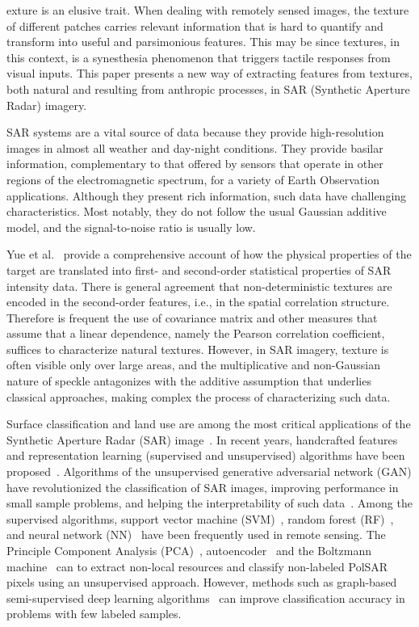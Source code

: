 \documentclass[journal]{IEEEtran}
\begin{document}
	exture is an elusive trait.
	When dealing with remotely sensed images, the texture of different patches carries relevant information that is hard to quantify and transform into useful and parsimonious features.
	This may be since textures, in this context, is a synesthesia phenomenon that triggers tactile responses from visual inputs.
	This paper presents a new way of extracting features from textures, both natural and resulting from anthropic processes, in SAR (Synthetic Aperture Radar) imagery.
	
	SAR systems are a vital source of data because they provide high-resolution images in almost all weather and day-night conditions.
	They provide basilar information, complementary to that offered by sensors that operate in other regions of the electromagnetic spectrum, for a variety of Earth Observation applications.	
	Although they present rich information, such data have challenging characteristics.
	Most notably, they do not follow the usual Gaussian additive model, and the signal-to-noise ratio is usually low.
	
	Yue et al.~\cite{Yue2020Gaussian} provide a comprehensive account of how the physical properties of the target are translated into first- and second-order statistical properties of SAR intensity data.
	There is general agreement that non-deterministic textures are encoded in the second-order features, i.e., in the spatial correlation structure.
	Therefore is frequent the use of covariance matrix and other measures that assume that a linear dependence, namely the Pearson correlation coefficient, suffices to characterize natural textures.
	However, in SAR imagery, texture is often visible only over large areas, and the multiplicative and non-Gaussian nature of speckle antagonizes with the additive assumption that underlies classical approaches, making complex the process of characterizing such data.
	
	Surface classification and land use are among the most critical applications of the Synthetic Aperture Radar (SAR) image~\cite{Pottier2004Unsupervised}.
	In recent years, handcrafted features and representation learning (supervised and unsupervised) algorithms have been proposed~\cite{han2020unsupervised, huang2020classification, xie2020polsar}.
	Algorithms of the unsupervised generative adversarial network (GAN) have revolutionized the classification of SAR images, improving performance in small sample problems, and helping the interpretability of such data~\cite{liu2019task}.
	Among the supervised algorithms, support vector machine (SVM)~\cite{sukawattanavijit2017ga}, random forest (RF)~\cite{mcnairn2014early}, and neural network (NN)~\cite{lin2017deep} have been frequently used in remote sensing.
	The Principle Component Analysis (PCA)~\cite{ressel2015neural}, autoencoder~\cite{wang2019classification} and the Boltzmann machine~\cite{qin2017object} can to extract non-local resources and classify non-labeled PolSAR pixels using an unsupervised approach.
	However, methods such as graph-based semi-supervised deep learning algorithms~\cite{bi2018graph} can improve classification accuracy in problems with few labeled samples.
	
\end{document}
